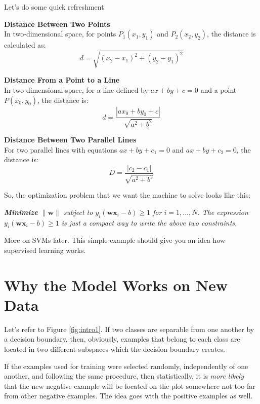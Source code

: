 Let's do some quick refreshment
\vspace*{1em}
\begin{tcolorbox}[enhanced jigsaw, breakable, pad at break*=1mm, colback=gray!20!white, colframe=black!85!black, title=\textbf{Distance Formulas in Euclidean Space}]
	\textbf{Distance Between Two Points} \\
	In two-dimensional space, for points \( P_1(x_1, y_1) \) and \( P_2(x_2, y_2) \), the distance is calculated as:
	\[ d = \sqrt{(x_2 - x_1)^2 + (y_2 - y_1)^2} \]

	\textbf{Distance From a Point to a Line} \\
	In two-dimensional space, for a line defined by \( ax + by + c = 0 \) and a point \( P(x_0, y_0) \), the distance is:
	\[ d = \frac{|ax_0 + by_0 + c|}{\sqrt{a^2 + b^2}} \]

	\textbf{Distance Between Two Parallel Lines} \\
	For two parallel lines with equations \( ax + by + c_1 = 0 \) and \( ax + by + c_2 = 0 \), the distance is:
	\[ D = \frac{|c_2 - c_1|}{\sqrt{a^2 + b^2}} \]
\end{tcolorbox}
\vspace*{1em}
So, the optimization problem that we want the machine to solve looks like this:

\textit{\textbf{Minimize} $\|\mathbf{w}\|$ subject to $y_{i}\left(\mathbf{w} \mathbf{x}_{i}-b\right) \geq 1$ for $i=1, \ldots, N$. The expression $y_{i}\left(\mathbf{w} \mathbf{x}_{i}-b\right) \geq 1$ is just a compact way to write the above two constraints.}

More on SVMs later. This simple example should give you an idea how supervised learning works.

\section{Why the Model Works on New Data}

Let's refer to Figure \ref{fig:intro1}. If two classes are separable from one another by a decision boundary, then, obviously, examples that belong to each class are located in two different subspaces which the decision boundary creates.

If the examples used for training were selected randomly, independently of one another, and following the same procedure, then statistically, it is \textit{more likely} that the new negative example will be located on the plot somewhere not too far from other negative examples.  The idea goes with the positive examples as well.

